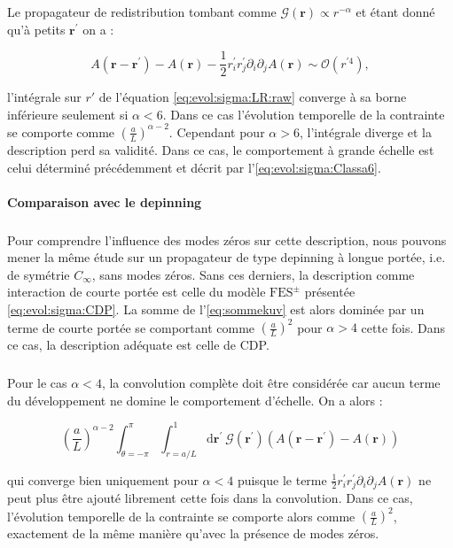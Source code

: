 \noindent Le propagateur de redistribution tombant comme $\mathcal{G}(\mathbf{r})\propto r^{-\alpha}$ et étant donné qu'à petits $\mathbf{r}^\prime$ on a :

\begin{equation}
A(\mathbf{r}-\mathbf{r}^\prime)-A(\mathbf{r})-\frac{1}{2}r_i^\prime r_j^\prime \partial_i\partial_jA(\mathbf{r}) \sim\mathcal{O}(r^{\prime 4}),
\end{equation}

\noindent l'intégrale sur $r'$ de l'équation \autoref{eq:evol:sigma:LR:raw} converge à sa borne inférieure seulement si $\alpha < 6$. Dans ce cas l'évolution temporelle de la contrainte se comporte comme $\left( \frac{a}{L} \right)^{\alpha - 2}$. Cependant pour $\alpha>6$, l'intégrale diverge et la description perd sa validité. Dans ce cas, le comportement à grande échelle est celui déterminé précédemment et décrit par l'\autoref{eq:evol:sigma:Classa6}.

\paragraph{Comparaison avec le depinning}

\subparagraph{}Pour comprendre l'influence des modes zéros sur cette description, nous pouvons mener la même étude sur un propagateur de type depinning à longue portée, i.e. de symétrie $C_\infty$, sans modes zéros. Sans ces derniers, la description comme interaction de courte portée est celle du modèle $\text{FES}^\pm$ présentée \autoref{eq:evol:sigma:CDP}. La somme de l'\autoref{eq:sommekuv} est alors dominée par un terme de courte portée se comportant comme $\left(  \frac{a}{L}\right)^2$ pour $\alpha>4$ cette fois. Dans ce cas, la description adéquate est celle de CDP.

\subparagraph{}Pour le cas $\alpha<4$, la convolution complète doit être considérée car aucun terme du développement ne domine le comportement d'échelle. On a alors :

\begin{equation}
    \left( \frac{a}{L} \right)^{\alpha - 2}\int_{\theta=-\pi}^\pi\int_{r=a/L}^{1} \mathrm{d}\mathbf{r}^\prime ~ \mathcal{G}(\mathbf{r}^\prime)
    \left( A(\mathbf{r}-\mathbf{r}^\prime)-A(\mathbf{r})\right)
\end{equation}

\noindent qui converge bien uniquement pour $\alpha<4$ puisque le terme $\frac{1}{2}r_i^\prime r_j^\prime \partial_i\partial_jA(\mathbf{r})$ ne peut plus être ajouté librement cette fois dans la convolution. Dans ce cas, l'évolution temporelle de la contrainte se comporte alors comme $\left(  \frac{a}{L}\right)^2$, exactement de la même manière qu'avec la présence de modes zéros.

